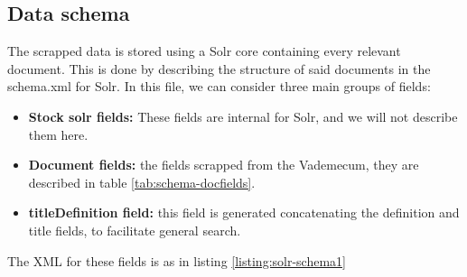 


\subsection{Data schema}
\label{subsec:solrschema}

The scrapped data is stored using a Solr core containing every relevant document. This is done by describing the structure of said documents in the schema.xml for Solr. In this file, we can consider three main groups of fields:

\begin{itemize}
 \item \textbf{Stock solr fields: } These fields are internal for Solr, and we will not describe them here.
 \item \textbf{Document fields: } the fields scrapped from the Vademecum, they are described in table \ref{tab:schema-docfields}.
 \item \textbf{titleDefinition field: } this field is generated concatenating the definition and title fields, to facilitate general search. %
\end{itemize}

The XML for these fields is as in listing \ref{listing:solr-schema1}
\begin{center}
  
\end{center}

